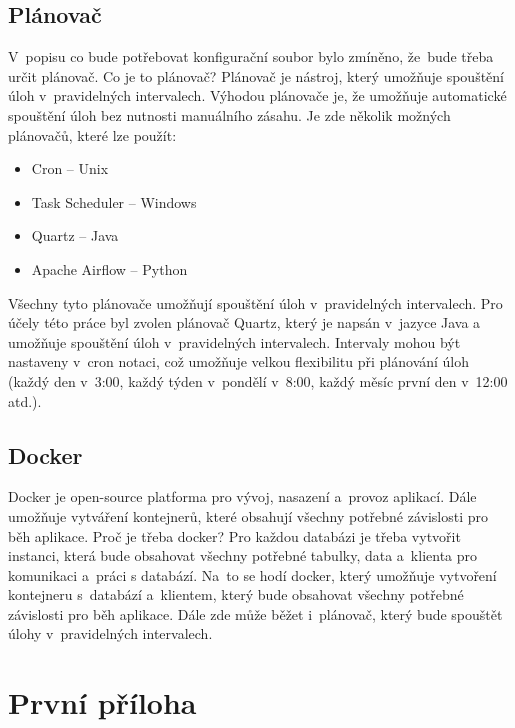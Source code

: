 \documentclass[czech, kiv, ba, he, iso690auyr, pdf]{fasthesis}
\begin{document}
\newpage
\section{Plánovač}
V~popisu co bude potřebovat konfigurační soubor bylo zmíněno, že~bude třeba určit plánovač.
Co je to plánovač?
Plánovač je nástroj, který umožňuje spouštění úloh v~pravidelných intervalech.
Výhodou plánovače je, že umožňuje automatické spouštění úloh bez nutnosti manuálního zásahu.
Je zde několik možných plánovačů, které lze použít:
\begin{itemize}
    \item Cron -- Unix
    \item Task Scheduler -- Windows
    \item Quartz -- Java
    \item Apache Airflow -- Python
\end{itemize}
Všechny tyto plánovače umožňují spouštění úloh v~pravidelných intervalech.
Pro účely této práce byl zvolen plánovač Quartz, který je napsán v~jazyce Java a 
umožňuje spouštění úloh v~pravidelných intervalech.
Intervaly mohou být nastaveny v~cron notaci, což umožňuje velkou flexibilitu při plánování úloh
(každý den v~3:00, každý týden v~pondělí v~8:00, každý měsíc první den v~12:00 atd.).

\section{Docker}
Docker je open-source platforma pro vývoj, nasazení a~provoz aplikací.
Dále umožňuje vytváření kontejnerů, které obsahují všechny potřebné závislosti pro běh aplikace.
Proč je třeba docker?
Pro každou databázi je třeba vytvořit instanci, která bude obsahovat všechny potřebné tabulky, data 
a~klienta pro komunikaci a~práci s databází. Na~to se hodí docker, který umožňuje vytvoření kontejneru s~databází
a~klientem, který bude obsahovat všechny potřebné závislosti pro běh aplikace.
Dále zde může běžet i~plánovač, který bude spouštět úlohy v~pravidelných intervalech.
\cite{docker}


\appendix
\chapter{První příloha}
\backmatter
\printbibliography
\setbackpageqrcode
\backpage
\end{document}
